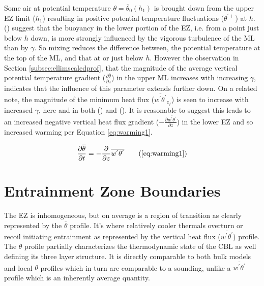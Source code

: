 Some air at potential temperature $\theta = \overline{\theta}_{0}(h_{1})$ is brought down from the upper \acs{EZ} limit ($h_{1}$) resulting in positive potential temperature fluctuations ($\theta^{'+}$) at $h$.\\

\citeauthor{GarciaMellado} (\citeyear{GarciaMellado}) suggest that the buoyancy in the lower portion of the \acs{EZ}, i.e. from a point just below $h$ down, is more strongly influenced by the vigorous turbulence of the \acs{ML} than by $\gamma$.  So mixing reduces the difference between, the potential temperature at the top of the \acs{ML}, and that at or just below $h$.  However the observation in Section \ref{subsec:ellimscaledprof}, that the magnitude of the average vertical potential temperature gradient ($\frac{\partial \overline{\theta}}{\partial z}$) in the upper \acs{ML} increases with increasing $\gamma$, indicates that the influence of this parameter extends further down.  On a related note, the magnitude of the minimum heat flux ($\overline{w^{'}\theta^{'}}_{z_{f}}$) is seen to increase with increased $\gamma$, here and in both \citeauthor{Sorbjan} (\citeyear{Sorbjan}) and \citeauthor{FedConzMir04} (\citeyear{FedConzMir04}).  It is reasonable to suggest this leads to an increased negative vertical heat flux gradient ($-\frac{\partial \overline{w^{'}\theta^{'}}}{\partial z}$) in the lower \acs{EZ} and so increased warming per Equation \ref{eq:warming1}.

\begin{equation}
\frac{\partial \overline{\theta}}{\partial t} = -\frac{\partial}{\partial z}\overline{w^{'}\theta^{'}} \tag{\ref{eq:warming1}}
\end{equation}

\section{Entrainment Zone Boundaries}

The \acs{EZ} is inhomogeneous, but on average is a region of transition as clearly represented by the $\overline{\theta}$ profile.  It's where relatively cooler thermals overturn or recoil initiating entrainment as represented by the vertical heat flux ($\overline{w^{'}\theta^{'}}$) profile.  The $\overline{\theta}$ profile partially characterizes the thermodynamic state of the \acs{CBL} as well defining its three layer structure.  It is directly comparable to both bulk models and local $\theta$ profiles which in turn are comparable to a sounding, unlike a $\overline{w^{'}\theta^{'}}$ profile which is an inherently average quantity.\\

